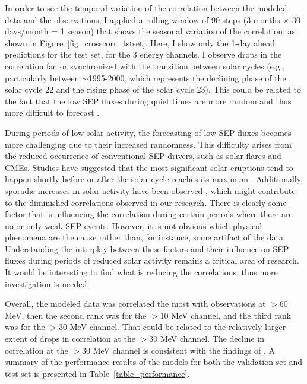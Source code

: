 In order to see the temporal variation of the correlation between the modeled data and the observations, I applied a rolling window of 90 steps (3 months $\times$ 30 days/month = 1 season) that shows the seasonal variation of the correlation, as shown in Figure~\ref{fig_crosscorr_tstset}.  
Here, I show only the 1-day ahead predictions for the test set, for the 3 energy channels. 
I observe drops in the correlation factor synchronized with the transition between solar cycles (e.g., particularly between $\sim$1995-2000, which represents the declining phase of the solar cycle 22 and the rising phase of the solar cycle 23). This could be related to the fact that the low SEP fluxes during quiet times are more random and thus more difficult to forecast \citep{feynman_1990, gabriel_1990, rodriguez_2010, xapsos_2012}.

During periods of low solar activity, the forecasting of low SEP fluxes becomes more challenging due to their increased randomness. This difficulty arises from the reduced occurrence of conventional SEP drivers, such as solar flares and CMEs. Studies have suggested that the most significant solar eruptions tend to happen shortly before or after the solar cycle reaches its maximum \citep{vsvestka_1995}. Additionally, sporadic increases in solar activity have been observed \citep{kane_2011}, which might contribute to the diminished correlations observed in our research.
There is clearly some factor that is influencing the correlation during certain periods where there are no or only weak SEP events. However, it is not obvious which physical phenomena are the cause rather than, for instance, some artifact of the data. Understanding the interplay between these factors and their influence on SEP fluxes during periods of reduced solar activity remains a critical area of research. It would be interesting to find what is reducing the correlations, thus more investigation is needed.

Overall, the modeled data was correlated the most with observations at $>$60 MeV, then the second rank was for the $>$10 MeV channel, and the third rank was for the $>$30 MeV channel. That could be related to the relatively larger extent of drops in correlation at the $>$30 MeV channel.
The decline in correlation at the $>$30 MeV channel is consistent with the findings of \citet{le_2017}.
A summary of the performance results of the models for both the validation set and test set is presented in Table~\ref{table_performance}.

